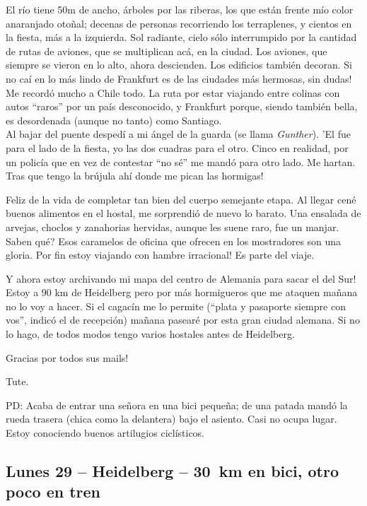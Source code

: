 El r\'io tiene 50m de ancho, \'arboles por las riberas, los que est\'an frente
m\'io color anaranjado oto\~nal; decenas de personas recorriendo los
terraplenes, y cientos en la fiesta, m\'as a la izquierda. Sol radiante, cielo
s\'olo interrumpido por la cantidad de rutas de aviones, que se multiplican
ac\'a, en la ciudad. Los aviones, que siempre se vieron en lo alto, ahora
descienden. Los edificios tambi\'en decoran. \textexclamdown Si no ca\'i en lo
m\'as lindo de Frankfurt es de las ciudades m\'as hermosas, sin dudas! Me
record\'o mucho a Chile todo. La ruta por estar viajando entre colinas con autos
``raros'' por un pa\'is desconocido, y Frankfurt porque, siendo tambi\'en bella,
es desordenada (aunque no tanto) como Santiago.\\

Al bajar del puente desped\'i a mi \'angel de la guarda (se llama {\sl Gunther}). 'El fue para el lado de la fiesta, yo las dos cuadras para el
otro. Cinco en realidad, por un polic\'ia que en vez de contestar ``no s\'e''
me mand\'o para otro lado. Me hartan. \textexclamdown Tras que tengo la
br\'ujula ah\'i donde me pican las hormigas!

Feliz de la vida de completar tan bien del cuerpo semejante etapa. Al llegar
cen\'e buenos alimentos en el hostal, me sorprendi\'o de nuevo lo barato. Una
ensalada de arvejas, choclos y zanahorias hervidas, aunque les suene raro, fue
un manjar. \textquestiondown Saben qu\'e? Esos caramelos de oficina que
ofrecen en los mostradores son una gloria. \textexclamdown Por fin estoy
viajando con hambre irracional! Es parte del viaje.

\textexclamdown Y ahora estoy archivando mi mapa del centro de Alemania para
sacar el del Sur! Estoy a 90 km de Heidelberg pero por m\'as hormigueros que
me ataquen ma\~nana no lo voy a hacer. Si el cagac\'in me lo permite (``plata
y pasaporte siempre con vos'', indic\'o el de recepci\'on) ma\~nana pasear\'e
por esta gran ciudad alemana. Si no lo hago, de todos modos tengo varios
hostales antes de Heidelberg.

\textexclamdown Gracias por todos sus mails!

Tute.

PD: Acaba de entrar una se\~nora en una bici peque\~na; de una patada mand\'o
la rueda trasera (chica como la delantera) bajo el asiento. Casi no ocupa
lugar. Estoy conociendo buenos artilugios cicl\'isticos.

\subsection*{Lunes 29 -- Heidelberg -- 30~km en bici, otro poco en tren}

